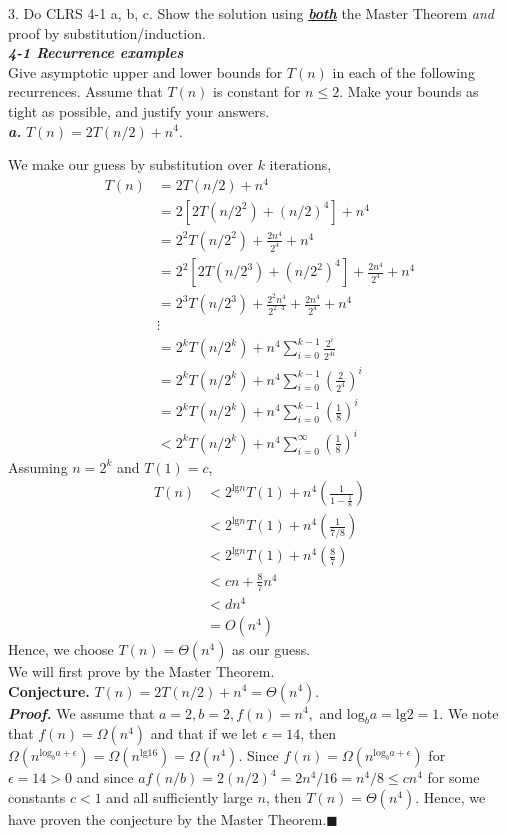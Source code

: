 \documentclass{article}
\begin{document}
3. Do CLRS 4-1 a, b, c. Show the solution using \textit{\textbf{\underline{both}}} the Master Theorem \textit{and} proof by substitution/induction.\\

\textit{\textbf{4-1 Recurrence examples}}\\
Give asymptotic upper and lower bounds for $T(n)$ in each of the following recurrences. Assume that $T(n)$ is constant for $n \leq 2$. Make your bounds as tight as possible, and justify your answers.\\

\textit{\textbf{a.}} $T(n) = 2T(n / 2) + n^4$.
\begin{adjustwidth}{2.5em}{0pt}
We make our guess by substitution over $k$ iterations,
\begin{align*}
T(n) &= 2T(n / 2) + n^4\\
&= 2[2T(n / 2^2) + (n/2)^4] + n^4\\
&= 2^2T(n / 2^2) + \frac{2n^4}{2^4} + n^4\\
&= 2^2[2T(n / 2^3) + (n/ 2^2)^4] + \frac{2n^4}{2^4} + n^4\\
&= 2^3T(n / 2^3) + \frac{2^2n^4}{2^{2 \cdot 4}} + \frac{2n^4}{2^4} + n^4\\
&\vdots\\
&= 2^kT(n / 2^k) + n^4\sum_{i=0}^{k - 1} \frac{2^i}{2^{4i}}\\
&= 2^kT(n / 2^k) + n^4\sum_{i=0}^{k - 1} (\frac{2}{2^{4}})^i\\
&= 2^kT(n / 2^k) + n^4\sum_{i=0}^{k - 1} (\frac{1}{8})^i\\
&< 2^kT(n / 2^k) + n^4\sum_{i=0}^{\infty} (\frac{1}{8})^i
\end{align*}
Assuming $n = 2^k$ and $T(1) = c$,
\begin{align*}
T(n) &< 2^{\text{lg}n}T(1) + n^4(\frac{1}{1 - \frac{1}{8}})\\
&< 2^{\text{lg}n}T(1) + n^4(\frac{1}{7/8})\\
&< 2^{\text{lg}n}T(1) + n^4(\frac{8}{7})\\
&< cn + \frac{8}{7}n^4\\
&< dn^4\\
&= O(n^4)
\end{align*}
Hence, we choose $T(n) = \Theta(n^4)$ as our guess.\\

We will first prove by the Master Theorem.\\
\textbf{Conjecture.} $T(n) = 2T(n / 2) + n^4 = \Theta(n^4).$\\
\textit{\textbf{Proof.}} We assume that $a = 2, b = 2, f(n) = n^4,$ and $\text{log}_b a = \text{lg}2 = 1.$ We note that $f(n) = \Omega(n^4)$ and that if we let $\epsilon = 14$, then $\Omega(n^{\text{log}_b a + \epsilon}) = \Omega(n^{\text{lg}16}) = \Omega(n^4)$. Since $f(n) = \Omega(n^{\text{log}_b a + \epsilon})$ for $\epsilon = 14 > 0$ and since $af(n / b) = 2(n / 2)^4 = 2n^4 / 16 = n^4 / 8 \leq cn^4$ for some constants $c < 1$ and all sufficiently large $n$, then $T(n) = \Theta(n^4)$. Hence, we have proven the conjecture by the Master Theorem.\hfill$\blacksquare$\\


\end{adjustwidth}
\end{document}
